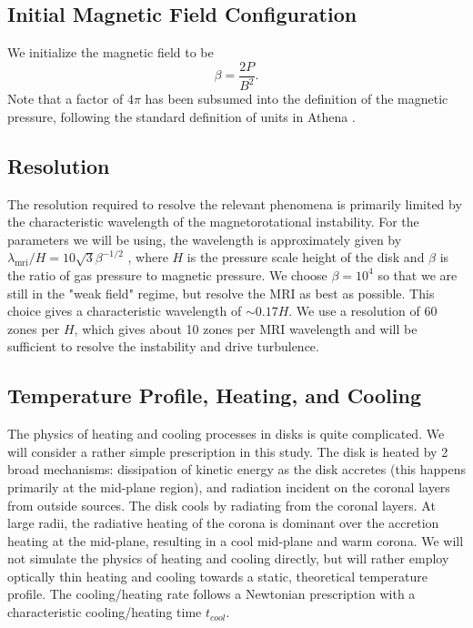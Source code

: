 \subsection{Initial Magnetic Field Configuration}
We initialize the magnetic field to be  
\begin{equation}
\beta = \frac{2P}{B^2}.                   
\end{equation}
\noindent 
Note that a factor of $4\pi$ has been subsumed into the definition of the magnetic pressure, following the standard definition of units in {\sc Athena} \citep{stone08}.


\subsection{Resolution}
The resolution required to resolve the relevant phenomena is primarily limited by the characteristic wavelength of the magnetorotational instability.  For the parameters we will be using, the wavelength is approximately given by $\lambda_\text{mri}/H = 10 \sqrt{3} \beta^{-1/2}$ , where $H$ is the pressure scale height of the disk and $\beta$ is the ratio of gas pressure to magnetic pressure.  We choose $\beta=10^4$ so that we are still in the "weak field" regime, but resolve the MRI as best as possible. This choice gives a characteristic wavelength of $\sim 0.17 H$.  We use a resolution of 60 zones per $H$, which gives about 10 zones per MRI wavelength and will be sufficient to resolve the instability and drive turbulence. 


\subsection{Temperature Profile, Heating, and Cooling}
The physics of heating and cooling processes in disks is quite complicated.  We will consider a rather simple prescription in this study.  The disk is heated by 2 broad mechanisms: dissipation of kinetic energy as the disk accretes (this happens primarily at the mid-plane region), and radiation incident on the coronal layers from outside sources.  The disk cools by radiating from the coronal layers.  At large radii, the radiative heating of the corona is dominant over the accretion heating at the mid-plane, resulting in a cool mid-plane and warm corona.  We will not simulate the physics of heating and cooling directly, but will rather employ optically thin heating and cooling towards a static, theoretical temperature profile.  The cooling/heating rate follows a Newtonian prescription with a characteristic cooling/heating time $t_{cool}$.


